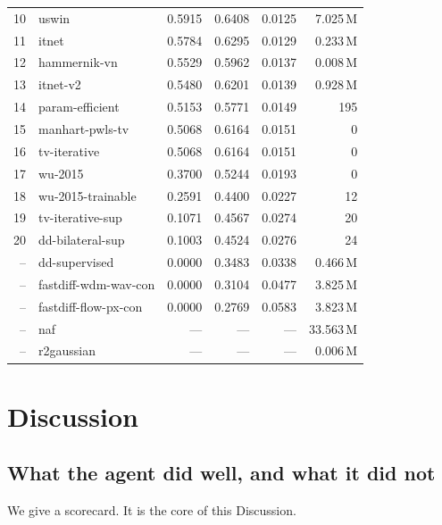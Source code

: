 \documentclass[AMA,twocolumn]{USG} %
\begin{document}
\begin{table}[t]
\begin{minipage}[t]{0.49\textwidth}
\begin{tabular}{@{}rlrrrr@{}}
10 & uswin                & 0.5915 & 0.6408 & 0.0125 & 7.025\,M \\
11 & itnet                & 0.5784 & 0.6295 & 0.0129 & 0.233\,M \\
12 & hammernik-vn         & 0.5529 & 0.5962 & 0.0137 & 0.008\,M \\
13 & itnet-v2             & 0.5480 & 0.6201 & 0.0139 & 0.928\,M \\
14 & param-efficient      & 0.5153 & 0.5771 & 0.0149 & 195 \\
15 & manhart-pwls-tv      & 0.5068 & 0.6164 & 0.0151 & 0 \\
16 & tv-iterative         & 0.5068 & 0.6164 & 0.0151 & 0 \\
17 & wu-2015              & 0.3700 & 0.5244 & 0.0193 & 0 \\
18 & wu-2015-trainable    & 0.2591 & 0.4400 & 0.0227 & 12 \\
19 & tv-iterative-sup     & 0.1071 & 0.4567 & 0.0274 & 20 \\
20 & dd-bilateral-sup     & 0.1003 & 0.4524 & 0.0276 & 24 \\
-- & dd-supervised        & 0.0000 & 0.3483 & 0.0338 & 0.466\,M \\
-- & fastdiff-wdm-wav-con & 0.0000 & 0.3104 & 0.0477 & 3.825\,M \\
-- & fastdiff-flow-px-con & 0.0000 & 0.2769 & 0.0583 & 3.823\,M \\
-- & naf                  & ---    & ---    & ---    & 33.563\,M \\
-- & r2gaussian           & ---    & ---    & ---    & 0.006\,M \\
\bottomrule
\end{tabular}
\end{minipage}
\end{table}

\section{Discussion}\label{sec:discussion}

\subsection{What the agent did well, and what it did not}\label{sec:scorecard}

We give a scorecard. It is the core of this Discussion.
\end{document}
